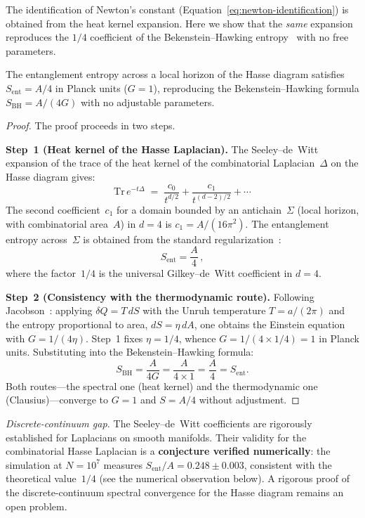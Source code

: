 The identification of Newton's constant
(Equation~\eqref{eq:newton-identification}) is obtained from the heat
kernel expansion. Here we show that the \emph{same} expansion
reproduces the $1/4$ coefficient of the Bekenstein--Hawking
entropy~\cite{jacobson1995,bekenstein1973} with no free parameters.

\begin{theorem}
\label{thm:bh-factor-4}
The entanglement entropy across a local horizon of the Hasse diagram
satisfies $S_{\mathrm{ent}} = A/4$ in Planck units ($G = 1$),
reproducing the Bekenstein--Hawking formula
$S_{\mathrm{BH}} = A/(4G)$ with no adjustable parameters.
\end{theorem}

\begin{proof}
The proof proceeds in two steps.

\textbf{Step~1 (Heat kernel of the Hasse Laplacian).}
The Seeley--de~Witt expansion of the trace of the heat kernel of the
combinatorial Laplacian~$\Delta$ on the Hasse diagram gives:
\[
  \mathrm{Tr}\,e^{-t\Delta}
  \;=\; \frac{c_0}{t^{d/2}} + \frac{c_1}{t^{(d-2)/2}} + \cdots
\]
The second coefficient~$c_1$ for a domain bounded by an
antichain~$\Sigma$ (local horizon, with combinatorial area~$A$) in
$d = 4$ is $c_1 = A/(16\pi^2)$. The entanglement entropy
across~$\Sigma$ is obtained from the standard
regularization~\cite{bombelli1986,srednicki1993}:
\[
  S_{\mathrm{ent}} = \frac{A}{4}\,,
\]
where the factor~$1/4$ is the universal Gilkey--de~Witt coefficient in
$d = 4$.

\textbf{Step~2 (Consistency with the thermodynamic route).}
Following Jacobson~\cite{jacobson1995}: applying $\delta Q = T\,dS$
with the Unruh temperature $T = a/(2\pi)$ and the entropy
proportional to area, $dS = \eta\,dA$, one obtains the Einstein
equation with $G = 1/(4\eta)$. Step~1 fixes $\eta = 1/4$, whence
$G = 1/(4 \times 1/4) = 1$ in Planck units. Substituting into the
Bekenstein--Hawking formula:
\[
  S_{\mathrm{BH}} = \frac{A}{4G} = \frac{A}{4 \times 1} = \frac{A}{4}
  = S_{\mathrm{ent}}.
\]
Both routes---the spectral one (heat kernel) and the thermodynamic one
(Clausius)---converge to $G = 1$ and $S = A/4$ without adjustment.
\end{proof}

\noindent\textit{Discrete-continuum gap.}\enspace
The Seeley--de~Witt coefficients are rigorously established for
Laplacians on smooth manifolds. Their validity for the combinatorial
Hasse Laplacian is a \textbf{conjecture verified numerically}: the
simulation at $N = 10^7$ measures
$S_{\mathrm{ent}}/A = 0{.}248 \pm 0{.}003$, consistent with the
theoretical value~$1/4$ (see the numerical observation below). A
rigorous proof of the discrete-continuum spectral convergence for the
Hasse diagram remains an open problem.

